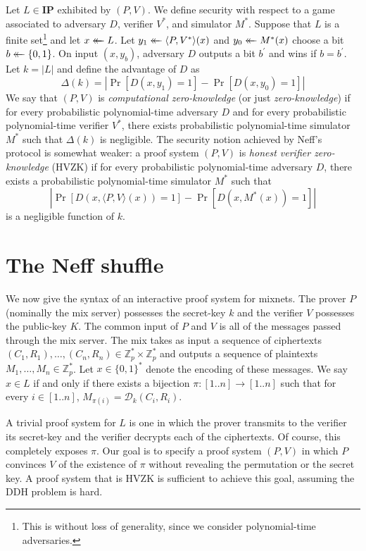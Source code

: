 \documentclass[letter]{article}
\newcounter{foot}
\newcommand{\Zmodp}{\mathbb{Z}_p}
\newcommand{\bits}{\{0,1\}}
\newcommand*\by{\times}
\newcommand{\getsr}{\mathrel{\leftarrow\mkern-14mu\leftarrow}}
\newcommand{\brackets}[1]{\langle #1 \rangle}
\newcommand{\class}[1]{\mathbf{#1}}
\newcommand{\pk}{K}
\newcommand{\sk}{k}
\newcommand{\varm}{M}
\newcommand{\varc}{C}
\newcommand{\varr}{R}
\newcommand{\advD}{D}
\newcommand{\dec}{\mathcal{D}}
\begin{document}
Let $L \in \class{IP}$
exhibited by $(P, V)$. We define security with respect to a game associated to
adversary $D$, verifier $V^*$, and simulator $M^*$. Suppose that $L$ is a finite
set\footnote{This is without loss of generality, since we
consider polynomial-time adversaries.} and let $x \getsr L$. Let $y_1 \getsr
\brackets{P, V^*}(x)$ and $y_0 \getsr M^*(x)$ choose a bit $b \getsr \bits$.
On input $(x, y_b)$, adversary $\advD$ outputs a bit $b^\prime$ and wins if
$b=b^\prime$. Let $k = |L|$ and define the advantage of $\advD$ as
\[
  \Delta(k) = |\Pr[\advD(x, y_1)=1] - \Pr[\advD(x, y_0)=1]|
\]
We say that $(P, V)$ is \emph{computational zero-knowledge} (or just
\emph{zero-knowledge}) if
for every probabilistic polynomial-time adversary $\advD$ and
  for every probabilistic polynomial-time verifier $V^*$,
    there exists probabilistic polynomial-time simulator $M^*$ such that $\Delta(k)$ is
    negligible.
The security notion achieved by Neff's protocol is somewhat weaker: a proof system $(P, V)$ is
\emph{honest verifier zero-knowledge} (HVZK) if
for every probabilistic polynomial-time adversary $\advD$,
  there exists a probabilistic polynomial-time simulator $M^*$ such that
\[
  |\Pr[\advD(x, \brackets{P,V}(x))=1] - \Pr[\advD(x, M^*(x))=1]|
\]
is a negligible function of $k$.

\section{The Neff shuffle} \label{section:neff-shuffle}

We now give the syntax of an interactive proof system for mixnets. The prover
$P$ (nominally the mix server) possesses the secret-key $\sk$ and the verifier $V$ possesses
the public-key $\pk$. The common input of $P$ and $V$ is all of the messages passed through the
mix server. The mix takes as input a sequence of ciphertexts $(\varc_1,
\varr_1), \ldots, (\varc_n, \varr_n) \in \Zmodp^* \by \Zmodp^*$ and outputs a
sequence of plaintexts $\varm_{1}, \ldots, \varm_{n} \in \Zmodp^*$. Let $x \in
\bits^*$ denote the encoding of these messages. We say $x \in L$ if and only if
there exists a bijection $\pi : [1..n] \rightarrow [1..n] $ such that for every $i \in [1..n]$,
$\varm_{\pi(i)} = \dec_k(\varc_{i}, \varr_{i})$.

A trivial proof system for $L$ is one in which the prover transmits to the
verifier its secret-key and the verifier decrypts each of the ciphertexts. Of
course, this completely exposes $\pi$. Our goal is to specify a proof system $(P,
V)$ in which $P$ convinces $V$ of the existence of $\pi$ without revealing the
permutation or the secret key. A proof system that is HVZK is sufficient to
achieve this goal, assuming the DDH problem is hard.
\end{document}
